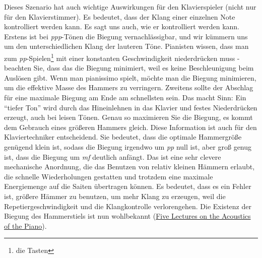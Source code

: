 Dieses Szenario hat auch wichtige Auswirkungen für den Klavierspieler (nicht nur für den Klavierstimmer).
Es bedeutet, dass der Klang einer einzelnen Note kontrolliert werden kann.
Es sagt uns auch, wie er kontrolliert werden kann.
Erstens ist bei \textit{ppp}-Tönen die Biegung vernachlässigbar, und wir kümmern uns um den unterschiedlichen Klang der lauteren Töne.
Pianisten wissen, dass man zum \textit{pp}-Spielen\footnote{die Tasten} mit einer konstanten Geschwindigkeit niederdrücken muss - beachten Sie, dass das die Biegung minimiert, weil es keine Beschleunigung beim Auslösen gibt.
Wenn man pianissimo spielt, möchte man die Biegung minimieren, um die effektive Masse des Hammers zu verringern.
Zweitens sollte der Abschlag für eine maximale Biegung am Ende am schnellsten sein.
Das macht Sinn: Ein \enquote{tiefer Ton} wird durch das Hineinlehnen in das Klavier und festes Niederdrücken erzeugt, auch bei leisen Tönen.
Genau so maximieren Sie die Biegung, es kommt dem Gebrauch eines größeren Hammers gleich.
Diese Information ist auch für den Klaviertechniker entscheidend.
Sie bedeutet, dass die optimale Hammergröße genügend klein ist, sodass die Biegung irgendwo um \textit{pp} null ist, aber groß genug ist, dass die Biegung um \textit{mf} deutlich anfängt.
Das ist eine sehr clevere mechanische Anordnung, die das Benutzen von relativ kleinen Hämmern erlaubt, die schnelle Wiederholungen gestatten und trotzdem eine maximale Energiemenge auf die Saiten übertragen können.
Es bedeutet, dass es ein Fehler ist, größere Hämmer zu benutzen, um mehr Klang zu erzeugen, weil die Repetiergeschwindigkeit und die Klangkontrolle verlorengehen.
Die Existenz der Biegung des Hammerstiels ist nun wohlbekannt (\hyperref[Lectures]{Five Lectures on the Acoustics of the Piano}).

